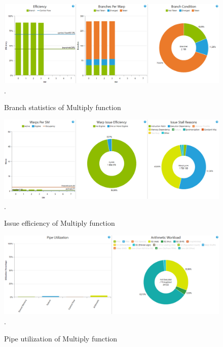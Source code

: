 \documentclass[oneside,openright,12pt,final,en]{mgr}
\begin{document}
\begin{figure}[H]
	\centering
	\includegraphics[width=\textwidth]{mull_branch}.
	\caption{Branch statistics of Multiply function}
	\label{fig:multiply_branch}
\end{figure}

\begin{figure}[H]
	\centering
	\includegraphics[width=\textwidth]{mull_issue}.
	\caption{Issue efficiency of Multiply function}
	\label{fig:multiply_issue}
\end{figure}

\begin{figure}[H]
	\centering
	\includegraphics[width=\textwidth]{mull_pipe}.
	\caption{Pipe utilization of Multiply function}
	\label{fig:multiply_pipe}
\end{figure}
\end{document}
